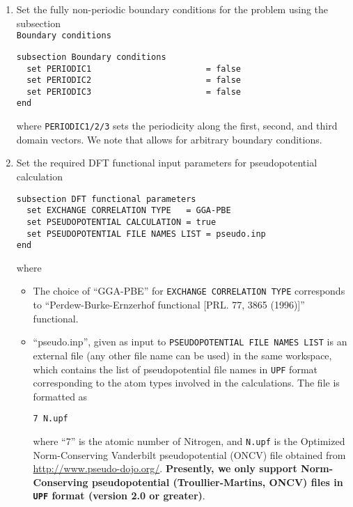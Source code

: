 \begin{enumerate}
\begin{itemize}
{\bf We require Cartesian coordinates for fully non-periodic simulation domain like above while fractional coordinates
are mandatory for periodic and semi-periodic simulation domain.}
\end{itemize}

\item Set the fully non-periodic boundary conditions for the problem using the subsection\\ \verb|Boundary conditions|
\begin{verbatim}	
subsection Boundary conditions
  set PERIODIC1                       = false
  set PERIODIC2                       = false
  set PERIODIC3                       = false
end
\end{verbatim}
where \verb|PERIODIC1/2/3| sets the periodicity along the first, second, and third domain vectors.
We note that \dftfe{} allows for arbitrary boundary conditions.

\item
Set the required DFT functional input parameters for pseudopotential calculation 	
\begin{verbatim}
subsection DFT functional parameters
  set EXCHANGE CORRELATION TYPE   = GGA-PBE
  set PSEUDOPOTENTIAL CALCULATION = true
  set PSEUDOPOTENTIAL FILE NAMES LIST = pseudo.inp
end
\end{verbatim}
where
\begin{itemize}		
\item The choice of ``GGA-PBE'' for \verb|EXCHANGE CORRELATION TYPE| corresponds to ``Perdew-Burke-Ernzerhof
functional [PRL. 77, 3865 (1996)]'' functional. 
		
\item ``pseudo.inp'', given as input to \verb|PSEUDOPOTENTIAL FILE NAMES LIST| is an external file (any other file name can be used) in the same workspace, which contains the list of pseudopotential file names in \verb|UPF| format corresponding to the atom types involved in the calculations. The file is formatted as 
\begin{verbatim}
7 N.upf
\end{verbatim}
		where ``7'' is the atomic number of Nitrogen, and \verb|N.upf| is the Optimized Norm-Conserving Vanderbilt pseudopotential (ONCV) file obtained from \url{http://www.pseudo-dojo.org/}. {\bf Presently, we only support Norm-Conserving pseudopotential (Troullier-Martins, ONCV) files in \verb|UPF| format (version 2.0 or greater)}.
\end{itemize}


\end{enumerate}
